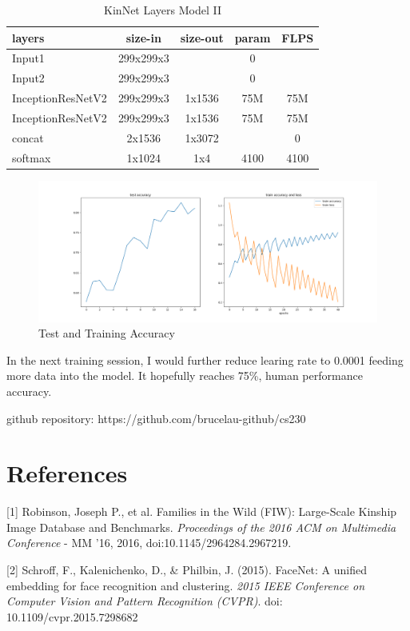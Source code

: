 \documentclass{article}
\begin{document}
\begin{table}[h]
	\centering
	\begin{tabular}{ | l | c | c | c | c |}
		\hline
		\textbf{layers}&\textbf{size-in}&\textbf{size-out}&\textbf{param}&\textbf{FLPS}\\
		\hline
			Input1 & 299x299x3 & & 0 & \\
			Input2 & 299x299x3 & & 0 & \\
			InceptionResNetV2 & 299x299x3 & 1x1536 & 75M & 75M \\
			InceptionResNetV2 & 299x299x3 & 1x1536 & 75M & 75M \\
			concat & 2x1536 & 1x3072 & & 0 \\
			softmax & 1x1024 & 1x4 & 4100 & 4100 \\
		\hline
	\end{tabular}
	\caption{KinNet Layers Model II}
	\label{table:3}
\end{table}


\begin{figure}[h]
	\caption{Test and Training Accuracy}
	\includegraphics[width=1\textwidth]{img/loss_accuracy}
	\centering
\end{figure}

In the next training session, I would further reduce learing rate to 0.0001 feeding more data into the model. It hopefully reaches 75\%, human performance accuracy.

github repository: https://github.com/brucelau-github/cs230

\newpage
\section*{References}
\medskip
\small
[1] Robinson, Joseph P., et al. Families in the Wild (FIW): Large-Scale Kinship
Image Database and Benchmarks. {\it Proceedings of the 2016 ACM on Multimedia
Conference} - MM '16, 2016, doi:10.1145/2964284.2967219.

[2] Schroff, F., Kalenichenko, D., \& Philbin, J. (2015). FaceNet: A unified
embedding for face recognition and clustering. {\it 2015 IEEE Conference on
Computer Vision and Pattern Recognition (CVPR)}. doi: 10.1109/cvpr.2015.7298682
\end{document}
